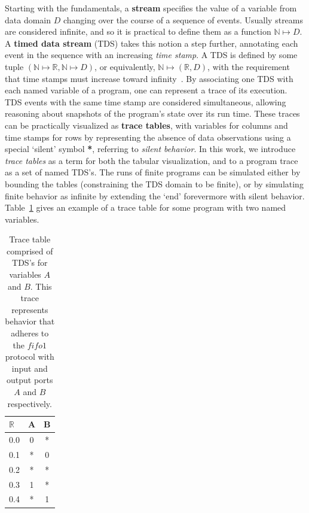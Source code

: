 Starting with the fundamentals, a \textbf{stream} specifies the value of a variable from data domain $D$ changing over the course of a sequence of events. Usually streams are considered infinite, and so it is practical to define them as a function $\mathbb{N}\mapsto{}D$. A \textbf{timed data stream} (TDS) takes this notion a step further, annotating each event in the sequence with an increasing \textit{time stamp}. A TDS is defined by some tuple $(\mathbb{N}\mapsto{}\mathbb{R}, \mathbb{N}\mapsto{}D)$, or equivalently, $\mathbb{N}\mapsto{}(\mathbb{R}, D)$, with the requirement that time stamps must increase toward infinity~\cite{arbab2004modeling}. By associating one TDS with each named variable of a program, one can represent a trace of its execution. TDS events with the same time stamp are considered simultaneous, allowing reasoning about snapshots of the program's state over its run time. These traces can be practically visualized as \textbf{trace tables}, with variables for columns and time stamps for rows by representing the absence of data observations using a special `silent' symbol \textbf{*}, referring to \textit{silent behavior}. In this work, we introduce \textit{trace tables} as a term for both the tabular visualization, and to a program trace as a set of named TDS's. The runs of finite programs can be simulated either by bounding the tables (constraining the TDS domain to be finite), or by simulating finite behavior as infinite by extending the `end' forevermore with silent behavior. Table~\ref{tab:fifo1_eg} gives an example of a trace table for some program with two named variables.


\begin{table}[]
	\centering
	\begin{tabular}{l|cc}
		$\mathbb{R}$  & A & B \\ \hline
		0.0 & 0 & * \\
		0.1 & * & 0 \\
		0.2 & * & * \\
		0.3 & 1 & * \\
		0.4 & * & 1
	\end{tabular}
	\caption[Trace table of a system adherent to fifo1.]{Trace table comprised of TDS's for variables $A$ and $B$. This trace represents behavior that adheres to the $fifo1$ protocol with input and output ports $A$ and $B$ respectively.}
	\label{tab:fifo1_eg}
\end{table}


